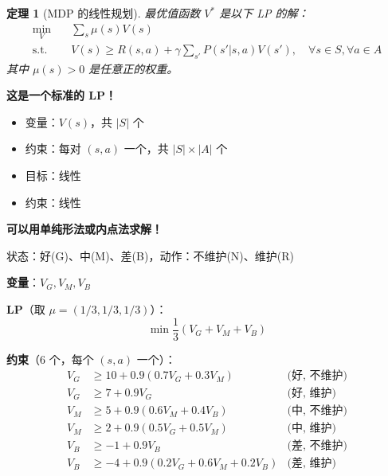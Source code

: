 \documentclass[12pt, a4paper]{ctexart}
\newtheorem{theorem}{定理}[section]
\begin{document}
\begin{blackboard}[MDP 的 LP 形式]

\begin{theorem}[MDP 的线性规划]
最优值函数 $V^*$ 是以下 LP 的解：
\[
\begin{aligned}
\min_V \quad & \sum_s \mu(s) V(s) \\
\text{s.t.} \quad & V(s) \geq R(s,a) + \gamma \sum_{s'} P(s'|s,a) V(s'), \quad \forall s \in S, \forall a \in A
\end{aligned}
\]
其中 $\mu(s) > 0$ 是任意正的权重。
\end{theorem}

\textbf{这是一个标准的 LP！}
\begin{itemize}
    \item 变量：$V(s)$，共 $|S|$ 个
    \item 约束：每对 $(s, a)$ 一个，共 $|S| \times |A|$ 个
    \item 目标：线性
    \item 约束：线性
\end{itemize}

\textbf{可以用单纯形法或内点法求解！}

\end{blackboard}

\begin{blackboard}[机器维护问题的 LP]

状态：好(G)、中(M)、差(B)，动作：不维护(N)、维护(R)

\textbf{变量}：$V_G, V_M, V_B$

\textbf{LP}（取 $\mu = (1/3, 1/3, 1/3)$）：
\[
\min \frac{1}{3}(V_G + V_M + V_B)
\]

\textbf{约束}（6 个，每个 $(s,a)$ 一个）：
\begin{align*}
V_G &\geq 10 + 0.9(0.7 V_G + 0.3 V_M) & \text{(好, 不维护)} \\
V_G &\geq 7 + 0.9 V_G & \text{(好, 维护)} \\
V_M &\geq 5 + 0.9(0.6 V_M + 0.4 V_B) & \text{(中, 不维护)} \\
V_M &\geq 2 + 0.9(0.5 V_G + 0.5 V_M) & \text{(中, 维护)} \\
V_B &\geq -1 + 0.9 V_B & \text{(差, 不维护)} \\
V_B &\geq -4 + 0.9(0.2 V_G + 0.6 V_M + 0.2 V_B) & \text{(差, 维护)}
\end{align*}

\end{blackboard}
\end{document}
